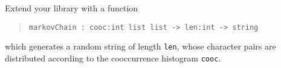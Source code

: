 \label{markov2}
Extend your library with a function
\begin{quote}
  \mbox{\lstinline!markovChain : cooc:int list list -> len:int -> string!}
\end{quote}
which generates a random string of length \lstinline!len!, whose
character pairs are distributed according to the cooccurrence
histogram \lstinline!cooc!.
